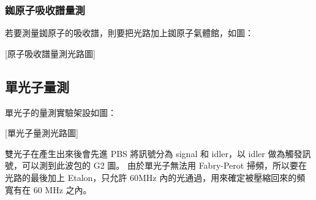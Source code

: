 \documentclass[class=NCU_thesis, crop=false]{standalone}
\begin{document}
\subsubsection{銣原子吸收譜量測}
若要測量銣原子的吸收譜，則要把光路加上銣原子氣體館，如圖：

[原子吸收譜量測光路圖]

\subsection{單光子量測}
單光子的量測實驗架設如圖：

[單光子量測光路圖]

雙光子在產生出來後會先進 PBS 將訊號分為 signal 和 idler，以 idler 做為觸發訊號，可以測到此波包的 G2 圖。
由於單光子無法用 Fabry-Perot 掃頻，所以要在光路的最後加上 Etalon，只允許 60MHz 內的光通過，用來確定被壓縮回來的頻寬有在 60 MHz 之內。
\end{document}
